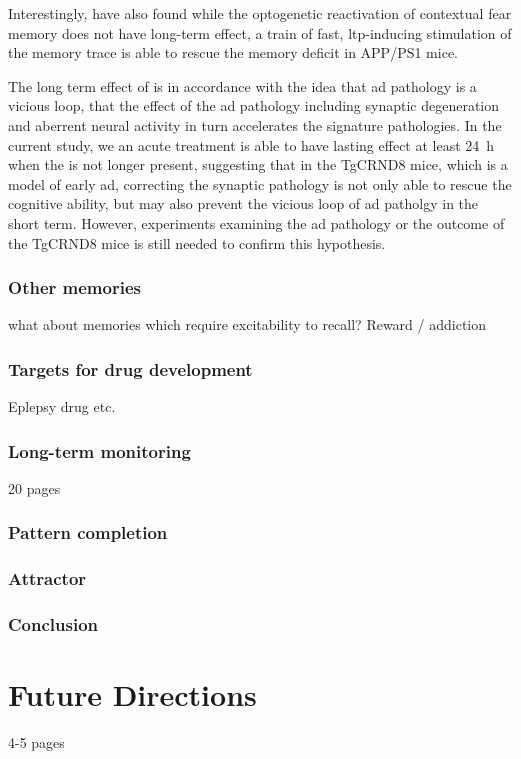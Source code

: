 Interestingly, \citet{roy16} have also found while the optogenetic reactivation of contextual fear memory does not have long-term effect, a train of fast, \gls{ltp}-inducing stimulation of the memory trace is able to rescue the memory deficit in APP/PS1 mice. 

The long term effect of \tglu is in accordance with the idea that \gls{ad} pathology is a vicious loop, that the effect of the \gls{ad} pathology including synaptic degeneration and aberrent neural activity in turn accelerates the signature pathologies. In the current study, we an acute \tglu treatment is able to have lasting effect at least \SI{24}{\hour} when the \tglu is not longer present, suggesting that in the TgCRND8 mice, which is a model of early \gls{ad}, correcting the synaptic pathology is not only able to rescue the cognitive ability, but may also prevent the vicious loop of \gls{ad} patholgy in the short term. However, experiments examining the \gls{ad} pathology or the outcome of the TgCRND8 mice is still needed to confirm this hypothesis. 
\subsection{Other memories}
what about memories which require excitability to recall?
Reward / addiction


\subsection{Targets for drug development}
Eplepsy drug etc.
\subsection{Long-term monitoring}
20 pages

\subsection{Pattern completion}
\subsection{Attractor}

\subsection{Conclusion}

\chapter{Future Directions}
4-5 pages
